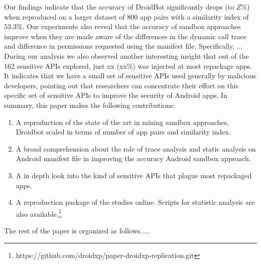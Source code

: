 Our findings indicate that the accuracy of DroidBot significantly drops (to $Z\%$) when reproduced on a larger dataset of $800$ app pairs with a similarity index of $53.3\%$. Our experiments also reveal that the accuracy of sandbox approaches improve when they are made aware of the differences in the dynamic call trace and difference in permissions requested using the manifest file. Specifically, ... 
During our analysis we also observed another interesting insight that out of the 162 sensitive APIs explored, just xx (xx\%) was injected at most repackage apps. It indicates that we have a small set of sensitive APIs used generally by malicious developers, pointing out that researchers can concentrate their effort on this specific set of sensitive APIs to improve the security of Android apps. 
In summary, this paper makes the following contributions:

\begin{enumerate}[1.]
\item A reproduction of the state of the art in mining sandbox approaches, Droidbot scaled in terms of number of app pairs and similarity index.
\item A broad comprehension about the role of trace analysis and static analysis on Android manifest file in improving the accuracy Android sandbox approach.
\item A in depth look into the kind of sensitive APIs that plague most repackaged apps.
\item A reproduction package of the studies online. Scripts for statistic analysis are also available.\footnote{https://github.com/droidxp/paper-droidxp-replication.git}
\end{enumerate}


The rest of the paper is organized as follows.....




